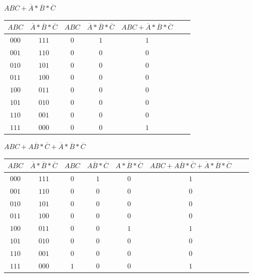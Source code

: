 \documentclass[12pt,largemargins]{homework}
\date{Septemeber 6, 2018}
\begin{document}
\maketitle
{}
\begin{alphaparts}
\item
$ABC + \overline{A} *\overline{B} *\overline{C}$ \\

\begin{tabular}{|c|c|c|c|c|c|c|}
\hline
$ABC$ & $\overline{A}*\overline{B}*\overline{C}$ & $ABC$ & $\overline{A} *\overline{B} *\overline{C}$ & $ABC + \overline{A} *\overline{B} *\overline{C}$ \\
\hline
$000$ & $111$ & $ 0 $ & $ 1$ & $ 1$ \\
$001$ & $110$ & $ 0 $ & $ 0$ & $ 0$ \\
$010$ & $101$ & $ 0 $ & $ 0$ & $ 0$ \\
$011$ & $100$ & $ 0 $ & $ 0$ & $ 0$ \\
$100$ & $011$ & $ 0 $ & $ 0$ & $ 0$ \\
$101$ & $010$ & $ 0 $ & $ 0$ & $ 0$ \\
$110$ & $001$ & $ 0 $ & $ 0$ & $ 0$ \\
$111$ & $000$ & $ 0 $ & $ 0$ & $ 1$ \\
\hline

\end{tabular}

\item
$ABC + A  \overline{B} * \overline{C} + \overline{A} * \overline{B} * \overline{C}$ \\

\begin{tabular}{|c|c|c|c|c|c|c|c|}
\hline
$ABC$ & $\overline{A}*\overline{B}*\overline{C}$ & $ABC$ & $A  \overline{B} * \overline{C}$ & $A * \overline{B} * \overline{C}$ & $ABC + A  \overline{B} * \overline{C} + \overline{A} * \overline{B} * \overline{C}$ \\
\hline
$000$ & $111$ & $ 0 $ & $ 1$ & $ 0$ & $ 1$ \\
$001$ & $110$ & $ 0 $ & $ 0$ & $ 0$ & $ 0$\\
$010$ & $101$ & $ 0 $ & $ 0$ & $ 0$ & $ 0$ \\
$011$ & $100$ & $ 0 $ & $ 0$ & $ 0$ & $ 0$ \\
$100$ & $011$ & $ 0 $ & $ 0$ & $ 1$ & $ 1$ \\
$101$ & $010$ & $ 0 $ & $ 0$ & $ 0$ & $ 0$ \\
$110$ & $001$ & $ 0 $ & $ 0$ & $ 0$ & $ 0$ \\
$111$ & $000$ & $ 1 $ & $ 0$ & $ 0$ & $ 1$ \\
\hline


\end{tabular}
\end{alphaparts}
\end{document}
